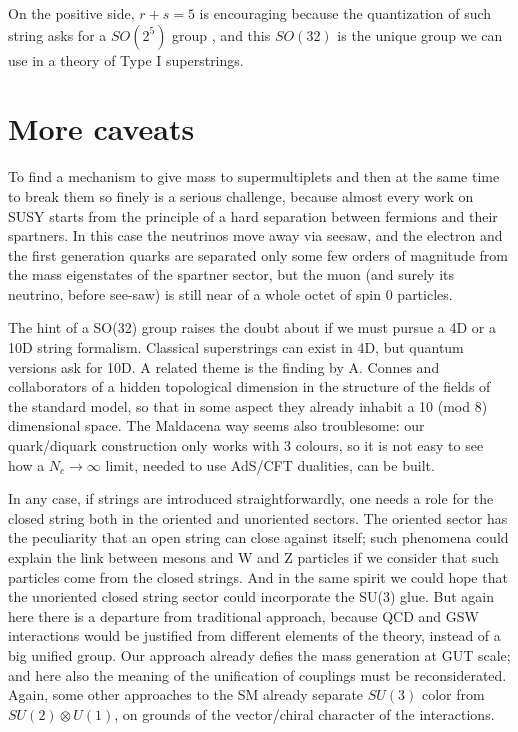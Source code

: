 \documentclass[a4paper,10pt]{article}
\begin{document}
On the positive side, $r+s=5$ is encouraging because the quantization of such string asks for a $SO(2^5)$ group \cite{Marcus:1986cm}, and this $SO(32)$ is the unique group we can use in a theory of Type I superstrings. 

\section{More caveats}

To find a mechanism to give mass to supermultiplets and then at the same time to break them so finely is a serious challenge, because almost every work on SUSY starts from the principle of a hard separation between fermions and their spartners. In this case the neutrinos move away via seesaw, and the electron and the first generation quarks are separated only some few orders of magnitude from the mass eigenstates of the spartner sector, but the muon (and surely its neutrino, before see-saw) is still near of a whole octet of spin 0 particles.

The hint of a SO(32) group raises the doubt about if we must pursue a 4D or a 10D string formalism. Classical superstrings can exist in 4D, but quantum versions ask for 10D. A related theme is the finding by A. Connes and collaborators of a hidden topological dimension in the structure of the fields of the standard model, so that in some aspect they already inhabit a 10 (mod 8) dimensional space. The Maldacena way seems also troublesome: our quark/diquark construction only works with 3 colours, so it is not easy to see how a $N_c\to \infty$ limit, needed to use AdS/CFT dualities, can be built.

In any case, if strings are introduced straightforwardly, one needs a role for the closed string both in the oriented and unoriented sectors. The oriented sector has the peculiarity that an open string can close against itself; such phenomena could explain the link \cite{Rivero:2006rb} between mesons and W and Z particles if we consider that such particles come from the closed strings. And in the same spirit we could hope that the unoriented closed string sector could incorporate the SU(3) glue. But again here there is a departure from traditional approach, because QCD and GSW interactions would be justified from different elements of the theory, instead of a big unified group. Our approach already defies the mass generation at GUT scale; and here also the meaning of the unification of couplings must be reconsiderated. Again, some other approaches to the SM already separate $SU(3)$ color from $SU(2) \otimes U(1)$, on grounds of the vector/chiral character of the interactions.
\end{document}
